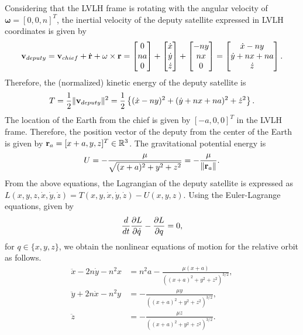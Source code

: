 Considering that the LVLH frame is rotating with the angular velocity of $\mathbf{\omega}=[0,0,n]^T$, the inertial velocity of the deputy satellite expressed in LVLH coordinates is given by
\begin{align*}
\mathbf{v}_{deputy}
=
\mathbf{v}_{chief} + \dot{\mathbf{r}} + \mathbf{\omega}\times \mathbf{r} = 
\begin{bmatrix}
0 \\ na \\ 0
\end{bmatrix}
+
\begin{bmatrix}
\dot x \\ \dot y \\ \dot z
\end{bmatrix}
+
\begin{bmatrix}
-n y \\ nx \\ 0
\end{bmatrix}
=
\begin{bmatrix}
\dot x - ny \\ \dot y + nx + na \\ \dot z
\end{bmatrix}.
\end{align*}
Therefore, the (normalized) kinetic energy of the deputy satellite is 
\begin{align*}
T = \frac{1}{2}\|\mathbf{v}_{deputy}\|^2 = \frac{1}{2} \left\{ (\dot x -ny)^2+(\dot y + nx +na)^2 + \dot z^2 \right\}.
\end{align*}
The location of the Earth from the chief is given by $[-a,0,0]^T$ in the LVLH frame. Therefore, the position vector of the deputy from the center of the Earth is given by 
$\mathbf{r}_a=[x+a,y,z]^T\in\mathbb{R}^3$. The gravitational potential energy is 
\begin{align*}
U = -\frac{\mu}{\sqrt{(x+a)^2 + y^2 + z^2}} = -\frac{\mu}{\|\mathbf{r}_a\|}.
\end{align*}
From the above equations, the Lagrangian of the deputy satellite is expressed as $L(x,y,z,\dot x,\dot y ,\dot z) = T(x,y,\dot x,\dot y,\dot z)- U(x,y,z)$. Using the Euler-Lagrange equations, given by
\begin{align*}
\frac{d}{dt}\frac{\partial L}{\partial \dot q}-\frac{\partial L}{\partial q}=0,
\end{align*}
for $q\in\{x,y,z\}$, we obtain the nonlinear equations of motion for the relative orbit as follows.
\begin{align}
\ddot x - 2n\dot y -n^2 x&=n^2 a - \frac{\mu (x+a)}{((x+a)^2 + y^2 + z^2)^{3/2}},\label{eqn:ddotx}\\
\ddot y + 2n\dot x -n^2 y &=   - \frac{\mu y}{((x+a)^2 + y^2 + z^2)^{3/2}},\label{eqn:ddoty}\\
\ddot z &= - \frac{\mu z}{((x+a)^2 + y^2 + z^2)^{3/2}}.\label{eqn:ddotz}
\end{align}

